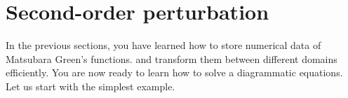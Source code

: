 \documentclass[submission, LectureNotes]{SciPost}
\begin{document}
%
%
%

\section{Second-order perturbation}
In the previous sections, you have learned how to store numerical data of Matsubara Green's functions.
and transform them between different domains efficiently.
You are now ready to learn how to solve a diagrammatic equations.
Let us start with the simplest example.
\end{document}
